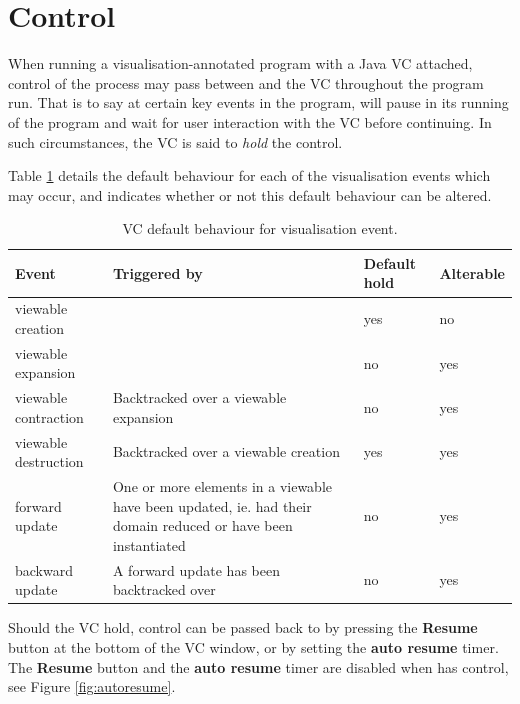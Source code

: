 \section{Control}

When running a visualisation-annotated {\eclipse} program with a Java
VC attached, control of the {\eclipse} process may pass between
{\eclipse} and the VC throughout the program run.  That is to say at
certain key events in the program, {\eclipse} will pause in its
running of the program and wait for user interaction with the VC
before continuing.  In such circumstances, the VC is said to
\emph{hold} the control.

Table \ref{tab:events} details the default behaviour for each of the
visualisation events which may occur, and indicates whether or not
this default behaviour can be altered.

\begin{table}[htp]
\label{tab:events}
\begin{tabular}{|l|p{7cm}|l|l|}
\hline
Event & Triggered by & Default hold & Alterable \\
\hline
\hline
viewable creation &
\viewablecreatetwo{} \viewablecreatethree{} \viewablecreatefour{} &
yes &
no \\
\hline
viewable expansion &
\viewableexpandthree{} \viewableexpandfour{} &
no &
yes \\
\hline
viewable contraction &
Backtracked over a viewable expansion &
no &
yes \\
\hline
viewable destruction &
Backtracked over a viewable creation &
yes &
yes \\
\hline
forward update &
One or more elements in a viewable have been updated, ie. had their
domain reduced or have been instantiated &
no &
yes \\
\hline
backward update &
A forward update has been backtracked over &
no &
yes \\
\hline
\end{tabular}
\caption{VC default behaviour for visualisation event.}
\end{table}

Should the VC hold, control can be passed back to {\eclipse} by
pressing the \textbf{Resume} button at the bottom of the VC window, or
by setting the \textbf{auto resume} timer.  The \textbf{Resume} button
and the \textbf{auto resume} timer are disabled when {\eclipse} has
control, see Figure \ref{fig:autoresume}.

